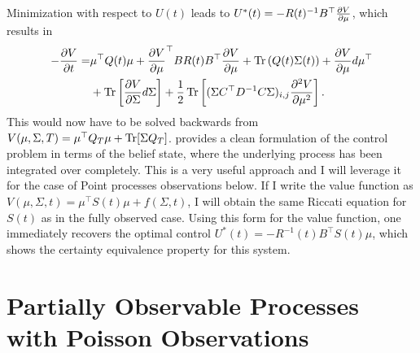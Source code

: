 Minimization with respect to $U(t)$ leads to $U^*(t) = -R(t)^{-1} B^\top \frac{\partial V}{\partial \mu}$, which results in
\begin{eqnarray}
-\pd{V}{t} =& \mu^\top Q(t)\mu + \pd{V}{\mu}^\top B R(t) B^\top \pd{V}{\mu} + \Tr\left(Q(t)\Sigma(t)\right) +\frac{\partial V}{\partial \mu}d\mu^\top\nonumber\\&+ \Tr\left[\frac{\partial V}{\partial \Sigma}d\Sigma\right] +\frac{1}{2} \Tr\left[(\Sigma C^\top D^{-1} C \Sigma)_{i,j} \frac{\partial^2 V}{\partial \mu^2}\right] .
\label{eq:lqg_hjb_partial}
\end{eqnarray}
This would now have to be solved backwards from $V(\mu,\Sigma,T) = \mu^\top Q_T \mu + \operatorname{Tr}[\Sigma Q_T]$.  provides a clean formulation of the control problem in 
terms of the belief state, where the underlying process has been integrated over completely. This is a very useful approach and I will leverage it for the case of Point processes
observations below.
If I write the value function as $V(\mu,\Sigma,t) = \mu^\top S(t) \mu + f(\Sigma,t)$, I will obtain the same Riccati equation for $S(t)$ as in the fully observed case. Using this form for
the value function, one immediately recovers the optimal control $U^*(t) = -R^{-1}(t) B^\top S(t) \mu$, which shows the certainty equivalence property for this system.
\section{Partially Observable Processes with Poisson Observations}

